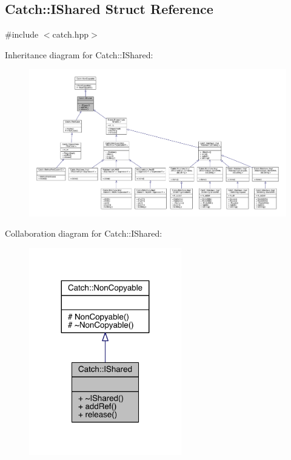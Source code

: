 \hypertarget{a00042}{}\subsection{Catch\+:\+:I\+Shared Struct Reference}
\label{a00042}


{\ttfamily \#include $<$catch.\+hpp$>$}



Inheritance diagram for Catch\+:\+:I\+Shared\+:\nopagebreak
\begin{figure}[H]
\begin{center}
\leavevmode
\includegraphics[width=350pt]{a00218}
\end{center}
\end{figure}


Collaboration diagram for Catch\+:\+:I\+Shared\+:\nopagebreak
\begin{figure}[H]
\begin{center}
\leavevmode
\includegraphics[width=188pt]{a00219}
\end{center}
\end{figure}
